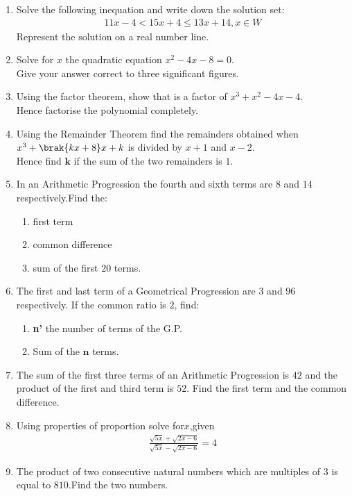 
\begin{enumerate}
\item Solve the following inequation and write down the solution set:\\
\begin{align}	
      11x-4<15x+4 \leq 13x+14,x\in W
\end{align}
\text Represent the solution on a real number line.
\item Solve for $x$ the quadratic equation $x^2 - 4x-8 = 0$.\\
Give your answer correct to three significant figures.
\item Using the factor theorem, show that  is a factor of $ x^3+x^2-4x-4$.\\
	Hence factorise the polynomial completely.
\item Using the Remainder Theorem find the remainders obtained when $x^3+\brak{kx+8}x+k$ is divided by $x+1$ and $x-2$.\\
Hence find $\textbf{k}$ if the sum of the two remainders is $1$.
\item In an Arithmetic Progression  the fourth and sixth terms are $8$ and $14$ respectively.Find the:
	\begin{enumerate}
	\item first term 
	\item common difference
	\item sum of the first $20$ terms.
	\end{enumerate}
\item The first and last term of a Geometrical Progression  are $3$ and $96$ respectively. If the common ratio is $2$, find:
\begin{enumerate}
    \item \textbf{n'} the number of terms of the G.P.
    \item Sum of the $\textbf{n}$ terms.
\end{enumerate}
\item The sum of the first three terms of an Arithmetic Progression  is $42$ and the product of the first and third term is $52$. Find the first term and the common difference. 
  
\item Using properties of proportion solve for$x$,given
\begin{align}
    \frac{\sqrt{5x}+\sqrt{2x-6}}{\sqrt{5x}-\sqrt{2x-6}}=4
\end{align}

\item The product of two consecutive natural numbers which are multiples of $3$ is equal to $810$.Find the two numbers.
\end{enumerate}

